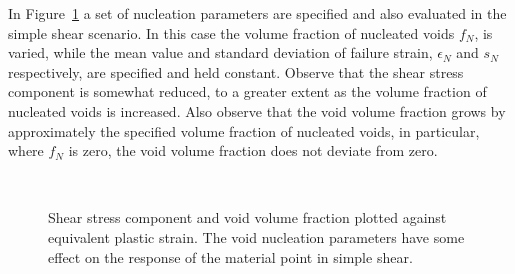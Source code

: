 In Figure~\ref{fig:shear-nuc} a set of nucleation parameters are
specified and also evaluated in the simple shear scenario. In this
case the volume fraction of nucleated voids $f_{N}$, is varied, while
the mean value and standard deviation of failure strain, $\epsilon_N$
and $s_N$ respectively, are specified and held constant. Observe that
the shear stress component is somewhat reduced, to a greater extent as
the volume fraction of nucleated voids is increased. Also observe that
the void volume fraction grows by approximately the specified volume
fraction of nucleated voids, in particular, where $f_{N}$ is zero, the
void volume fraction does not deviate from zero.

\begin{figure}[htbp]
  \begin{center}
    ~ 
    \caption{Shear stress component and void volume fraction plotted
      against equivalent plastic strain. The void nucleation
      parameters have some effect on the response of the
      material point in simple shear.}
    \label{fig:shear-nuc}
  \end{center}
\end{figure}

